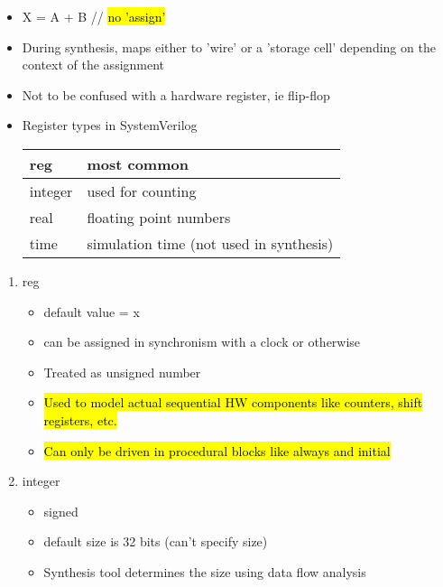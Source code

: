 \documentclass[11pt,twoside,a4paper,titlepage]{article}
\begin{document}
\begin{enumerate}
\begin{itemize}
            \item X = A + B // \hl{no 'assign'}
            \item During synthesis, maps either to 'wire' or a 'storage cell' depending on the context of the assignment
            \item Not to be confused with a hardware register, ie flip-flop
            \item Register types in SystemVerilog \\
                \begin{center}
                    \begin{tabular}[c]{|l|l|} \hline
                        reg    &  most common \\
                        \hline
                        integer  &  used for counting \\
                        \hline
                        real     &  floating point numbers \\
                        \hline
                        time     &  simulation time (not used in synthesis) \\
                        \hline
                    \end{tabular}
                \end{center}
        \end{itemize}
        \begin{enumerate}
            \item reg
                \begin{itemize}
                    \item default value = x
                    \item can be assigned in synchronism with a clock or otherwise
                    \item Treated as unsigned number
                    \item \hl{Used to model actual sequential HW components like counters, shift registers, etc.}
                    \item \hl{Can only be driven in procedural blocks like always and initial}
                \end{itemize}
            \item integer
                \begin{itemize}
                    \item signed
                    \item default size is 32 bits (can't specify size)
                    \item Synthesis tool determines the size using data flow analysis

\end{itemize}
\end{enumerate}
\end{enumerate}
\end{document}
